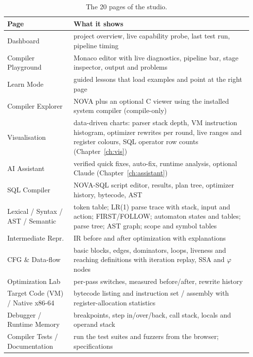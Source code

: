 \begin{table}[H]\centering\small
\begin{tabularx}{\textwidth}{@{}lX@{}}\toprule
\textbf{Page} & \textbf{What it shows}\\ \midrule
Dashboard & project overview, live capability probe, last test run, pipeline timing\\
Compiler Playground & Monaco editor with live diagnostics, pipeline bar, stage inspector, output and problems\\
Learn Mode & guided lessons that load examples and point at the right page\\
Compiler Explorer & NOVA plus an optional C viewer using the installed system compiler (compile-only)\\
Visualisation & data-driven charts: parser stack depth, VM instruction histogram, optimizer rewrites per round, live ranges and register colours, SQL operator row counts (Chapter~\ref{ch:vis})\\
AI Assistant & verified quick fixes, auto-fix, runtime analysis, optional Claude (Chapter~\ref{ch:assistant})\\
SQL Compiler & NOVA-SQL script editor, results, plan tree, optimizer history, bytecode, AST\\
Lexical / Syntax / AST / Semantic & token table; LR(1) parse trace with stack, input and action; FIRST/FOLLOW; automaton states and tables; parse tree; AST graph; scope and symbol tables\\
Intermediate Repr. & IR before and after optimization with explanations\\
CFG \& Data-flow & basic blocks, edges, dominators, loops, liveness and reaching definitions with iteration replay, SSA and $\varphi$ nodes\\
Optimization Lab & per-pass switches, measured before/after, rewrite history\\
Target Code (VM) / Native x86-64 & bytecode listing and instruction set / assembly with register-allocation statistics\\
Debugger / Runtime Memory & breakpoints, step in/over/back, call stack, locals and operand stack\\
Compiler Tests / Documentation & run the test suites and fuzzers from the browser; specifications\\ \bottomrule
\end{tabularx}
\caption{The 20 pages of the studio.}
\end{table}

